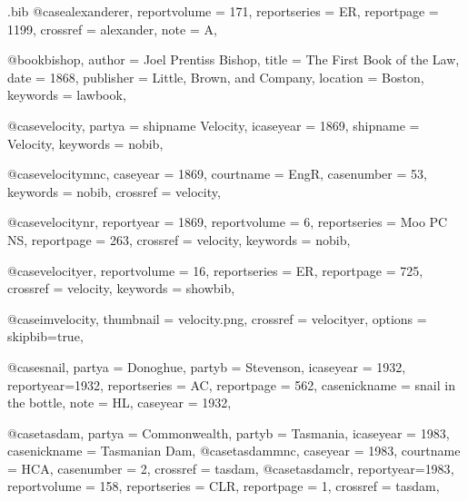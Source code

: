 \begin{filecontents*}[overwrite]{\jobname.bib}
@case{alexanderer,
  reportvolume = {171},
  reportseries = {ER},
  reportpage = {1199},
  crossref = {alexander},
  note = {A},
}




@book{bishop,
author = {Joel Prentiss Bishop},
title = {The First Book of the Law},
date = {1868},
publisher = {Little, Brown, and Company},
location = {Boston},
keywords = {lawbook},
}


@case{velocity,
  partya = {shipname Velocity},
  icaseyear = {1869},
  shipname = {Velocity},
  keywords = {nobib},
}

@case{velocitymnc,
  caseyear = {1869},
  courtname = {EngR},
  casenumber = {53},
  keywords = {nobib},
  crossref = {velocity},
}


@case{velocitynr,
  reportyear = {1869},
  reportvolume = {6},
  reportseries = {Moo PC NS},
  reportpage = {263},
  crossref = {velocity},
  keywords = {nobib},
}

@case{velocityer,
  reportvolume = {16},
  reportseries = {ER},
  reportpage = {725},
  crossref = {velocity},
  keywords = {showbib},
}


@case{imvelocity,
  thumbnail = {velocity.png},
  crossref = {velocityer},
  options = {skipbib=true},      
}



@case{snail,
  partya = {Donoghue}, 
  partyb = {Stevenson},
  icaseyear = {1932},
  reportyear={1932},
  reportseries = {AC},
  reportpage = {562},
  casenickname = {snail in the bottle},
  note = {HL},
  caseyear = {1932},
}


@case{tasdam,
  partya = {Commonwealth}, 
  partyb = {Tasmania},
  icaseyear = {1983},
  casenickname = {Tasmanian Dam},
  }
@case{tasdammnc,
  caseyear = {1983},
  courtname = {HCA},
  casenumber = {2},
  crossref = {tasdam},
  }
@case{tasdamclr,
  reportyear={1983},
  reportvolume = {158},
  reportseries = {CLR},
  reportpage = {1},
  crossref = {tasdam},
  }


\end{filecontents*}
